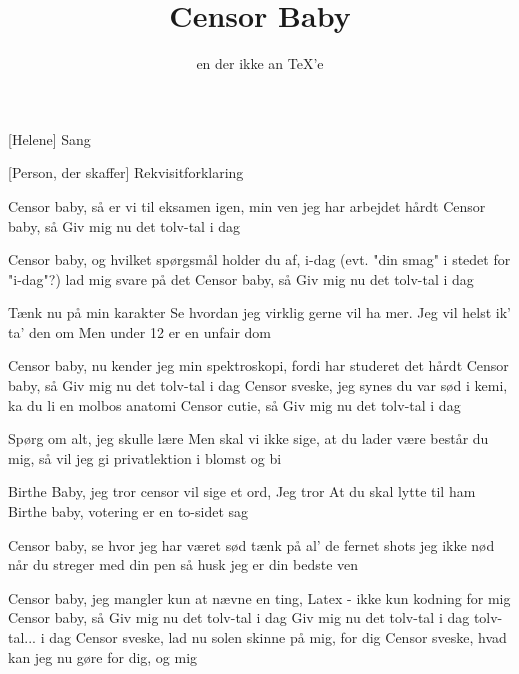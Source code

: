 \documentclass[a4paper,11pt]{article}
\title{Censor Baby}
\author{en der ikke an \TeX'e}
\begin{document}
\maketitle

\begin{roles}
    [Helene] Sang
\end{roles}

\begin{props}
    [Person, der skaffer] Rekvisitforklaring
\end{props}

\begin{song}
   Censor baby, så er vi til eksamen igen, min ven
  jeg har arbejdet hårdt
  Censor baby, så Giv mig nu det tolv-tal i dag

   Censor baby, og hvilket spørgsmål holder du af, i-dag (evt. "din smag" i stedet for "i-dag"?)
  lad mig svare på det
  Censor baby, så Giv mig nu det tolv-tal i dag

  Tænk nu på min karakter
  Se hvordan jeg virklig gerne vil ha mer.
  Jeg vil helst ik' ta' den om
  Men under 12 er en unfair dom

  Censor baby, nu kender jeg min spektroskopi, fordi
  har studeret det hårdt
  Censor baby, så Giv mig nu det tolv-tal i dag
  Censor sveske, jeg synes du var sød i kemi, ka du li en molbos anatomi
  Censor cutie, så Giv mig nu det tolv-tal i dag

  Spørg om alt, jeg skulle lære
  Men skal vi ikke sige, at du lader være
  består du mig, så vil jeg gi
  privatlektion i blomst og bi

  Birthe Baby, jeg tror censor vil sige et ord, Jeg tror
  At du skal lytte til ham
  Birthe baby, votering er en to-sidet sag

  Censor baby,
  se hvor jeg har været sød
  tænk på al' de fernet shots jeg ikke nød
  når du streger med din pen
  så husk jeg er din bedste ven

  Censor baby, jeg mangler kun at nævne en ting, Latex -
  ikke kun kodning for mig
  Censor baby, så Giv mig nu det tolv-tal i dag
  Giv mig nu det tolv-tal i dag
  tolv-tal... i dag
  Censor sveske, lad nu solen skinne på mig, for dig
  Censor sveske, hvad kan jeg nu gøre for dig, og mig


\end{song}
\end{document}
